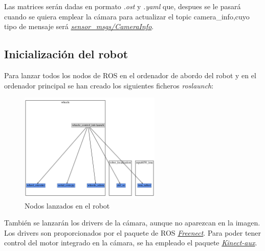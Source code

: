 Las matrices serán dadas en pormato \textit{.ost} y \textit{.yaml} que, despues se le pasará cuando se quiera emplear la cámara para actualizar el topic camera\_info,cuyo 
tipo de mensaje será \textit{\href{http://docs.ros.org/melodic/api/sensor_msgs/html/msg/CameraInfo.html}{sensor\_msgs/CameraInfo}}.\\

\newpage
\subsection{Inicialización del robot}
Para lanzar todos los nodos de ROS en el ordenador de abordo del robot y en el ordenador principal se han creado los siguientes ficheros \textit{roslaunch}:
    \begin{figure}[!ht]
        \centering
        \includegraphics[width=0.6\textwidth]{images/whee}
        \caption{Nodos lanzados en el robot}
    \end{figure}

También se lanzarán los drivers de la cámara, aunque no aparezcan en la imagen. Los drivers son proporcionados por el 
paquete de ROS \textit{\href{https://github.com/ros-drivers/freenect\_stack}{Freenect}}.
Para poder tener control del motor integrado en la cámara, se ha empleado el paquete \textit{\href{https://github.com/muhrix/kinect_aux}{Kinect-aux}}.
    



